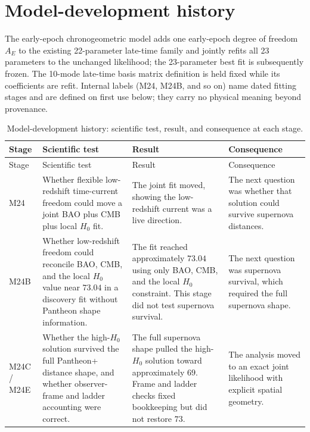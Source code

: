 \section{Model-development history}
\label{app:mutation-history}

The early-epoch chronogeometric model adds one early-epoch degree of
freedom $A_{E}$ to the existing 22-parameter late-time family and
jointly refits all 23 parameters to the unchanged likelihood; the
23-parameter best fit is subsequently frozen. The 10-mode late-time
basis matrix definition is held fixed while its coefficients are refit.
Internal labels (M24, M24B, and so on) name dated fitting stages and are
defined on first use below; they carry no physical meaning beyond
provenance.

{\footnotesize\setlength{\tabcolsep}{4pt}
\begin{longtable}{>{\raggedright\arraybackslash}p{}>{\raggedright\arraybackslash}p{}>{\raggedright\arraybackslash}p{}>{\raggedright\arraybackslash}p{}}
\caption{Model-development history: scientific test, result, and consequence at each stage.}\\
\toprule
Stage & Scientific test & Result & Consequence \\
\midrule
\endfirsthead
\toprule
Stage & Scientific test & Result & Consequence \\
\midrule
\endhead
\midrule
\endfoot
\bottomrule
\endlastfoot
M24 & Whether flexible low-redshift time-current freedom could move a joint BAO plus CMB plus local $H_{0}$ fit. & The joint fit moved, showing the low-redshift current was a live direction. & The next question was whether that solution could survive supernova distances. \\
\midrule
M24B & Whether low-redshift freedom could reconcile BAO, CMB, and the local $H_{0}$ value near $73.04$ in a discovery fit without Pantheon shape information. & The fit reached approximately $73.04$ using only BAO, CMB, and the local $H_{0}$ constraint. This stage did not test supernova survival. & The next question was supernova survival, which required the full supernova shape. \\
\midrule
M24C / M24E & Whether the high-$H_{0}$ solution survived the full Pantheon+ distance shape, and whether observer-frame and ladder accounting were correct. & The full supernova shape pulled the high-$H_{0}$ solution toward approximately $69$. Frame and ladder checks fixed bookkeeping but did not restore $73$. & The analysis moved to an exact joint likelihood with explicit spatial geometry. \\

\end{longtable}}

